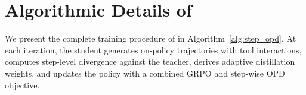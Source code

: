 \section{Algorithmic Details of \ourmodel}
\label{app:algorithm}

We present the complete training procedure of \ourmodel{} in Algorithm~\ref{alg:step_opd}. At each iteration, the student generates on-policy trajectories with tool interactions, computes step-level divergence against the teacher, derives adaptive distillation weights, and updates the policy with a combined GRPO and step-wise OPD objective.

\begin{algorithm}[h]
\caption{\ourmodel: Step-wise On-policy Distillation for Small Language Model Agents}
\label{alg:step_opd}


\end{algorithm}
